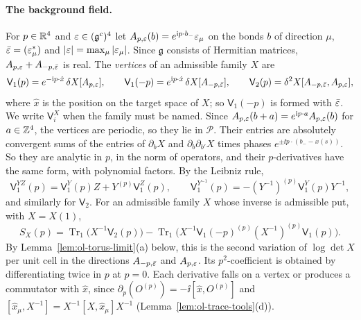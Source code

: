 \paragraph{The background field.} For $p\in\mathbb R^4$ and $\varepsilon\in(\mathfrak g^c)^4$ let $A_{p,\varepsilon}(b)=e^{\mathrm i p\cdot b_-}\varepsilon_\mu$ on the bonds $b$ of direction $\mu$, $\bar{\varepsilon}=(\varepsilon_\mu^*)$ and $|\varepsilon|=\max_\mu|\varepsilon_\mu|$. Since $\mathfrak g$ consists of Hermitian matrices, $A_{p,\varepsilon}+A_{-p,\bar{\varepsilon}}$ is real. The \emph{vertices} of an admissible family $X$ are
\[
\mathsf V_1(p)=e^{-\mathrm i p\cdot\hat x}\,\delta X[A_{p,\varepsilon}],\qquad\mathsf V_1(-p)=e^{\mathrm i p\cdot\hat x}\,\delta X[A_{-p,\bar{\varepsilon}}],\qquad\mathsf V_2(p)=\delta^2X[A_{-p,\bar{\varepsilon}},A_{p,\varepsilon}],
\]
where $\hat x$ is the position on the target space of $X$; so $\mathsf V_1(-p)$ is formed with $\bar{\varepsilon}$. We write $\mathsf V_i^X$ when the family must be named. Since $A_{p,\varepsilon}(b+a)=e^{\mathrm i p\cdot a}A_{p,\varepsilon}(b)$ for $a\in\mathbb Z^4$, the vertices are periodic, so they lie in $\mathscr P$. Their entries are absolutely convergent sums of the entries of $\partial_bX$ and $\partial_b\partial_{b'}X$ times phases $e^{\pm\ii p\cdot(b_--x(s))}$. So they are analytic in $p$, in the norm of operators, and their $p$-derivatives have the same form, with polynomial factors. By the Leibniz rule,
\[
\mathsf V_1^{YZ}(p)=\mathsf V_1^Y(p)Z+Y^{(p)}\mathsf V_1^Z(p),\qquad\mathsf V_1^{Y^{-1}}(p)=-(Y^{-1})^{(p)}\mathsf V_1^Y(p)Y^{-1},
\]
and similarly for $\mathsf V_2$. For an admissible family $X$ whose inverse is admissible put, with $X=X(1)$,
\begin{equation}\label{eq:ol-second-variation}
S_X(p)=\operatorname{Tr}_1\big(X^{-1}\mathsf V_2(p)\big)-\operatorname{Tr}_1\big(X^{-1}\mathsf V_1(-p)^{(p)}(X^{-1})^{(p)}\mathsf V_1(p)\big).
\end{equation}
By Lemma~\ref{lem:ol-torus-limit}(a) below, this is the second variation of $\log\det X$ per unit cell in the directions $A_{-p,\bar{\varepsilon}}$ and $A_{p,\varepsilon}$. Its $p^2$-coefficient is obtained by differentiating twice in $p$ at $p=0$. Each derivative falls on a vertex or produces a commutator with $\hat x$, since $\partial_p(O^{(p)})=-\ii[\hat x,O^{(p)}]$ and $[\hat x_\mu,X^{-1}]=X^{-1}[X,\hat x_\mu]X^{-1}$ (Lemma~\ref{lem:ol-trace-tools}(d)).

